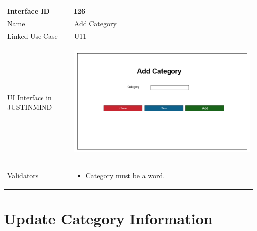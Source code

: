 \documentclass[12pt,a4paper]{report}
\begin{document}
\begin{tabular}{ | m{3cm} | m{12cm}| } \hline

Interface ID & I26  \\\hline

Name  &  Add Category \\ \hline

Linked Use Case & U11	 \\ \hline

UI Interface in JUSTINMIND & \begin{center} \includegraphics[scale=0.3]{./User Interface/UI-025 Add Category@1x.png}\end{center}  \\ \hline

Validators & 
\begin{itemize}
\item   Category must be a word.
\end{itemize}
\\ \hline
\end{tabular}
\section{Update Category Information}
\end{document}

